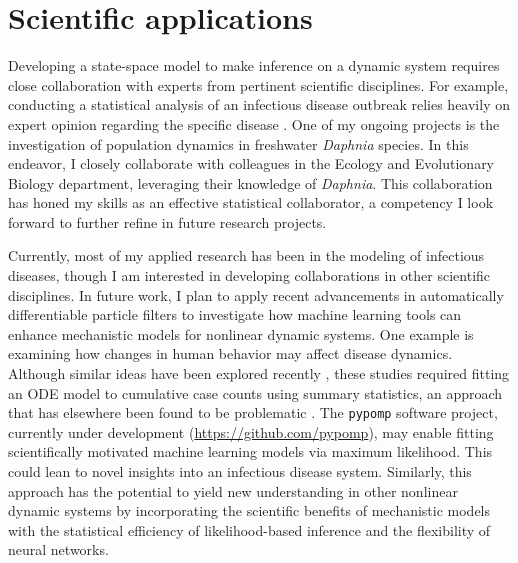 \documentclass{article}
\begin{document}
\section{Scientific applications}

Developing a state-space model to make inference on a dynamic system requires close collaboration with experts from pertinent scientific disciplines.
For example, conducting a statistical analysis of an infectious disease outbreak relies heavily on expert opinion regarding the specific disease \cite{wheeler24}.
One of my ongoing projects is the investigation of population dynamics in freshwater \emph{Daphnia} species.
In this endeavor, I closely collaborate with colleagues in the Ecology and Evolutionary Biology department, leveraging their knowledge of \emph{Daphnia}.
This collaboration has honed my skills as an effective statistical collaborator, a competency I look forward to further refine in future research projects.

Currently, most of my applied research has been in the modeling of infectious diseases, though I am interested in developing collaborations in other scientific disciplines.
In future work, I plan to apply recent advancements in automatically differentiable particle filters \cite{tan24} to investigate how machine learning tools can enhance mechanistic models for nonlinear dynamic systems.
One example is examining how changes in human behavior may affect disease dynamics.
Although similar ideas have been explored recently \cite{dandekar20,kim21}, these studies required fitting an ODE model to cumulative case counts using summary statistics, an approach that has elsewhere been found to be problematic \cite{king15}.
The \texttt{pypomp} software project, currently under development (\url{https://github.com/pypomp}), may enable fitting scientifically motivated machine learning models via maximum likelihood.
This could lean to novel insights into an infectious disease system.
Similarly, this approach has the potential to yield new understanding in other nonlinear dynamic systems by incorporating the scientific benefits of mechanistic models \cite{baker18} with the statistical efficiency of likelihood-based inference and the flexibility of neural networks.



\end{document}
